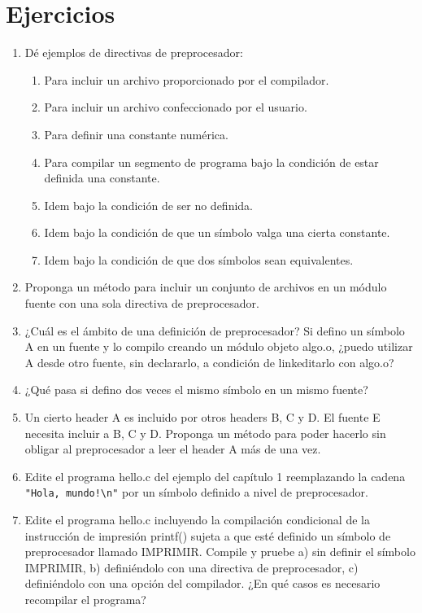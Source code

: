 
\section{Ejercicios}
\label{sec:tc-preprocesador-ej}
\begin{enumerate}
	\item Dé ejemplos de directivas de preprocesador:
		\begin{enumerate}[label=\alph*.]
\item Para incluir un archivo proporcionado por el compilador.
\item Para incluir un archivo confeccionado por el usuario.
\item Para definir una constante numérica.
\item Para compilar un segmento de programa bajo la condición de estar definida una constante.
\item Idem bajo la condición de ser no definida.
\item Idem bajo la condición de que un símbolo valga una cierta constante.
\item Idem bajo la condición de que dos símbolos sean equivalentes.
\end{enumerate}
\item Proponga un método para incluir un conjunto de archivos en un módulo fuente con una sola
directiva de preprocesador.
 \item ¿Cuál es el ámbito de una definición de preprocesador? Si defino un símbolo A en un fuente y lo
compilo creando un módulo objeto algo.o, ¿puedo utilizar A desde otro fuente, sin declararlo, a
condición de linkeditarlo con algo.o?
\item ¿Qué pasa si defino dos veces el mismo símbolo en un mismo fuente?
\item Un cierto header A es incluido por otros headers B, C y D. El fuente E necesita incluir a B, C y D.
Proponga un método para poder hacerlo sin obligar al preprocesador a leer el header A más de una
vez.
\item Edite el programa hello.c del ejemplo del capítulo 1 reemplazando la cadena \lstinline{"Hola, mundo!\n"} por
un símbolo definido a nivel de preprocesador.
\item  Edite el programa hello.c incluyendo la compilación condicional de la instrucción de impresión
printf() sujeta a que esté definido un símbolo de preprocesador llamado IMPRIMIR. Compile y pruebe
a) sin definir el símbolo IMPRIMIR, b) definiéndolo con una directiva de preprocesador, c)
definiéndolo con una opción del compilador. ¿En qué casos es necesario recompilar el programa?

\end{enumerate}
